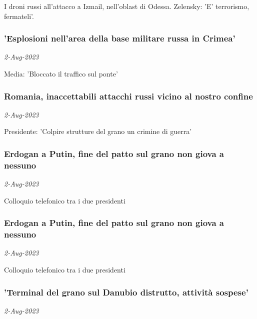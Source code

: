 I droni russi all'attacco a Izmail, nell'oblast di Odessa. Zelensky: 'E' terrorismo, fermateli'.
\subsubsection{'Esplosioni nell'area della base militare russa in Crimea' \href{https://www.ansa.it/sito/notizie/mondo/europa/2023/08/02/esplosioni-nellarea-della-base-militare-russa-in-crimea_e88c7ad0-e49a-4a69-a502-9ca9f24b2f68.html}{}}
\textit{2-Aug-2023}

Media: 'Bloccato il traffico sul ponte'
\subsubsection{Romania, inaccettabili attacchi russi vicino al nostro confine \href{https://www.ansa.it/sito/notizie/mondo/europa/2023/08/02/romania-inaccettabili-attacchi-russi-vicino-al-nostro-confine_8118ad78-87dd-4455-b66f-6efe2db1ddec.html}{}}
\textit{2-Aug-2023}

Presidente: 'Colpire strutture del grano un crimine di guerra'
\subsubsection{Erdogan a Putin, fine del patto sul grano non giova a nessuno \href{https://www.ansa.it/sito/notizie/mondo/europa/2023/08/02/erdogan-a-putin-fine-del-patto-sul-grano-non-giova-a-nessuno_247272a8-0382-4669-998f-250d4dd8618d.html}{}}
\textit{2-Aug-2023}

Colloquio telefonico tra i due presidenti
\subsubsection{Erdogan a Putin, fine del patto sul grano non giova a nessuno \href{https://www.ansa.it/sito/notizie/mondo/mediooriente/2023/08/02/erdogan-a-putin-fine-del-patto-sul-grano-non-giova-a-nessuno_b02b4766-b7c4-402b-a61b-5741c1a3f107.html}{}}
\textit{2-Aug-2023}

Colloquio telefonico tra i due presidenti
\subsubsection{'Terminal del grano sul Danubio distrutto, attivit\`{a} sospese' \href{https://www.ansa.it/sito/notizie/mondo/europa/2023/08/02/terminal-del-grano-sul-danubio-distrutto-attivita-sospese_c758e0bd-af4b-4be4-bd39-d59142df2c81.html}{}}
\textit{2-Aug-2023}

